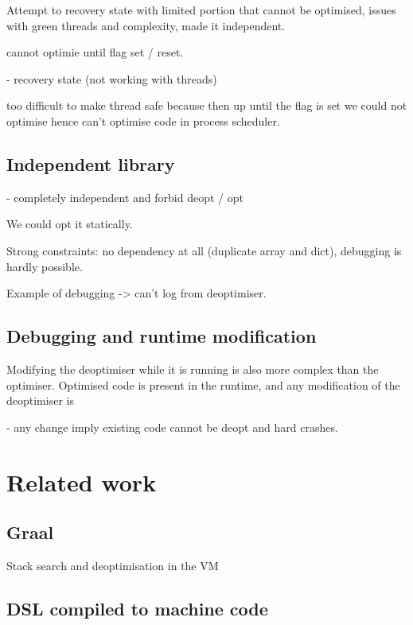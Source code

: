 \documentclass[a4paper,12pt,twoside]{../includes/ThesisStyle}
\begin{document}
 Attempt to recovery state with limited portion that cannot be optimised, issues with green threads and complexity, made it independent.

cannot optimie until flag set / reset.

- recovery state (not working with threads)

too difficult to make thread safe because then up until the flag is set we could not optimise hence can't optimise code in process scheduler.

\subsection{Independent library}

- completely independent and forbid deopt / opt

We could opt it statically.

Strong constraints: no dependency at all (duplicate array and dict), debugging is hardly possible.

Example of debugging -> can't log from deoptimiser. 

\subsection{Debugging and runtime modification}

Modifying the deoptimiser while it is running is also more complex than the optimiser. Optimised code is present in the runtime, and any modification of the deoptimiser is

- any change imply existing code cannot be deopt and hard crashes.


\section{Related work}
\subsection{Graal}

Stack search and deoptimisation in the VM

\subsection{DSL compiled to machine code}
\end{document}
